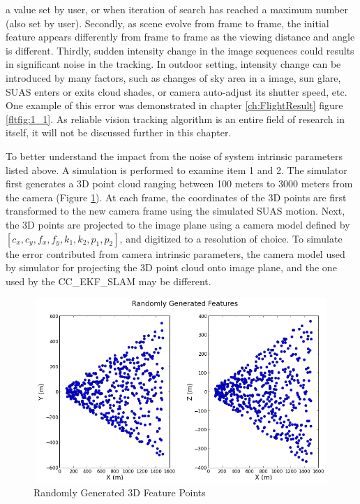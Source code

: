 \begin{enumerate}
  a value set by user, or when iteration of search has reached a
  maximum number (also set by user). Secondly, as scene evolve from
  frame to frame, the initial feature appears differently from frame
  to frame as the viewing distance and angle is different. Thirdly,
  sudden intensity change in the image sequences could results in
  significant noise in the tracking. In outdoor setting, intensity
  change can be introduced by many factors, such as changes of sky
  area in a image, sun glare, SUAS enters or exits cloud shades, or
  camera auto-adjust its shutter speed, etc. One example of this error
  was demonstrated in chapter \ref{ch:FlightResult} figure
  \ref{fltfig:1_1}. As reliable vision tracking algorithm is an
  entire field of research in itself, it will not be discussed further
  in this chapter.

\end{enumerate}

To better understand the impact from the noise of system intrinsic
parameters listed above. A simulation is performed to examine item 1
and 2. The simulator first generates a 3D point cloud ranging between
100 meters to 3000 meters from the camera (Figure \ref{fig:simfig51}).
At each frame, the coordinates of the 3D points are first transformed
to the new camera frame using the simulated SUAS motion. Next, the 3D
points are projected to the image plane using a camera model defined
by $[c_{x}, c_{y}, f_{x}, f_{y}, k_{1}, k_{2}, p_{1}, p_{2}]$, and
digitized to a resolution of choice. To simulate the error contributed
from camera intrinsic parameters, the camera model used by simulator
for projecting the 3D point cloud onto image plane, and the one used
by the CC\_EKF\_SLAM may be different.

\begin{figure}[h]
\centering
\includegraphics[width=12cm, height=7cm]{./Figures/SimulationFigures/Figure51.png}
\caption{Randomly Generated 3D Feature Points}
\label{fig:simfig51}
\end{figure}
\FloatBarrier

